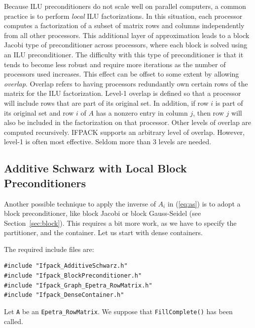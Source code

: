 Because ILU preconditioners do not scale well on parallel computers, a common
practice is to perform {\em local} ILU factorizations.  In this situation, each
processor computes a factorization of a subset of matrix rows and columns independently
from all other processors.  This additional layer of approximation leads to a block
Jacobi type of preconditioner across processors, where each block is solved using an
ILU preconditioner.  The difficulty with this type of preconditioner is that it 
tends to become less robust and require more iterations as the number of processors used
increases.  This effect can be offset to some extent by allowing {\em overlap}.  Overlap
refers to having processors redundantly own certain rows of the matrix for the ILU
factorization.  Level-1 overlap is defined so that a processor will include rows that
are part of its original set.  In addition, if row $i$ is part of its original set and 
row $i$ of $A$ has a nonzero entry in column $j$, then row $j$ will also
be included in the factorization on that processor.  Other levels of overlap are
computed recursively.  IFPACK supports an arbitrary level of overlap.  However,
level-1 is often most effective.  Seldom more than 3 levels are needed. 


\subsection{Additive Schwarz with Local Block Preconditioners}
\label{sec:as_b_ov}

Another possible technique to apply the inverse of $A_i$ in (\ref{eq:as})
is to adopt a block preconditioner, like block Jacobi 
or block Gauss-Seidel (see
Section~\ref{sec:block}). This requires a
bit more work, as we have to specify the partitioner, and the container. Let
us start with dense containers.

The required include files are:
\begin{verbatim}
#include "Ifpack_AdditiveSchwarz.h"
#include "Ifpack_BlockPreconditioner.h"
#include "Ifpack_Graph_Epetra_RowMatrix.h"
#include "Ifpack_DenseContainer.h"
\end{verbatim}

Let \verb!A! be an \verb!Epetra_RowMatrix!. We suppose that
\verb!FillComplete()! has been called. 

